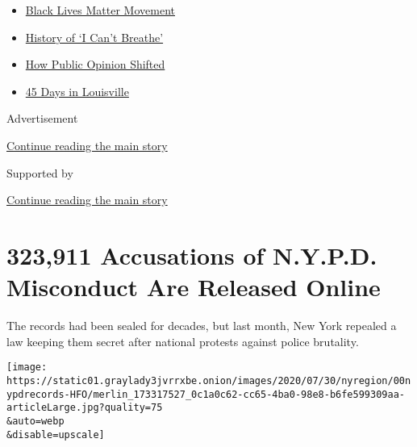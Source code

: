 \begin{itemize}
\tightlist
\item
  \href{https://www.nytimes3xbfgragh.onion/interactive/2020/07/03/us/george-floyd-protests-crowd-size.html?name=styln-george-floyd\&region=TOP_BANNER\&variant=undefined\&block=storyline_menu_recirc\&action=click\&pgtype=Article\&impression_id=b3286631-e38b-11ea-b524-5975769cbb40}{Black
  Lives Matter Movement}
\item
  \href{https://www.nytimes3xbfgragh.onion/interactive/2020/06/28/us/i-cant-breathe-police-arrest.html?name=styln-george-floyd\&region=TOP_BANNER\&variant=undefined\&block=storyline_menu_recirc\&action=click\&pgtype=Article\&impression_id=b3286632-e38b-11ea-b524-5975769cbb40}{History
  of `I Can't Breathe'}
\item
  \href{https://www.nytimes3xbfgragh.onion/interactive/2020/06/10/upshot/black-lives-matter-attitudes.html?name=styln-george-floyd\&region=TOP_BANNER\&variant=undefined\&block=storyline_menu_recirc\&action=click\&pgtype=Article\&impression_id=b3286633-e38b-11ea-b524-5975769cbb40}{How
  Public Opinion Shifted}
\item
  \href{https://www.nytimes3xbfgragh.onion/interactive/2020/07/16/us/black-lives-matter-protests-louisville-breonna-taylor.html?name=styln-george-floyd\&region=TOP_BANNER\&variant=undefined\&block=storyline_menu_recirc\&action=click\&pgtype=Article\&impression_id=b3286634-e38b-11ea-b524-5975769cbb40}{45
  Days in Louisville}
\end{itemize}

Advertisement

\protect\hyperlink{after-top}{Continue reading the main story}

Supported by

\protect\hyperlink{after-sponsor}{Continue reading the main story}

\hypertarget{323911-accusations-of-nypd-misconduct-are-released-online}{%
\section{323,911 Accusations of N.Y.P.D. Misconduct Are Released
Online}\label{323911-accusations-of-nypd-misconduct-are-released-online}}

The records had been sealed for decades, but last month, New York
repealed a law keeping them secret after national protests against
police brutality.

\texttt{[image: https://static01.graylady3jvrrxbe.onion/images/2020/07/30/nyregion/00nypdrecords-HFO/merlin\_173317527\_0c1a0c62-cc65-4ba0-98e8-b6fe599309aa-articleLarge.jpg?quality=75\\\&auto=webp\\\&disable=upscale]}

